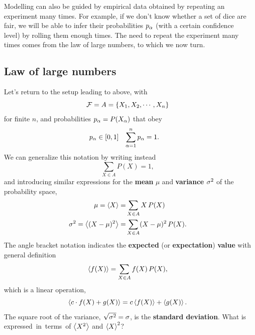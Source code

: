 Modelling can also be guided by empirical data obtained by repeating an experiment many times.
For example, if we don't know whether a set of dice are fair, we will be able to infer their probabilities $p_{\alpha}$ (with a certain confidence level) by rolling them enough times.
The need to repeat the experiment many times comes from the law of large numbers, to which we now turn.



\subsection{\label{sec:LLN}Law of large numbers}
Let's return to the setup leading to  above, with
\begin{equation*}
  \mathcal F = A = \left\{X_1, X_2, \cdots, X_n\right\}
\end{equation*}
for finite $n$, and probabilities $p_{\alpha} = P(X_{\alpha})$ that obey
\begin{align*}
  p_{\alpha} & \in [0, 1] &
  \sum_{\alpha = 1}^n p_{\alpha} & = 1.
\end{align*}
We can generalize this notation by writing instead
\begin{equation*}
  \sum_{X \in A} P(X) = 1,
\end{equation*}
and introducing similar expressions for the \textbf{mean} $\mu$ and \textbf{variance} $\sigma^2$ of the probability space,
\begin{align}
              \mu = \left\langle X \right\rangle = & \sum_{X \in A} X \, P(X)            \label{eq:mean} \\
  \sigma^2 = \left\langle (X - \mu)^2 \right\rangle = & \sum_{X \in A} (X - \mu)^2 \, P(X). \label{eq:var}
\end{align}
The angle bracket notation indicates the \textbf{expected} (or \textbf{expectation}) \textbf{value} with general definition
\begin{equation}
  \label{eq:expect_disc}
  \left\langle f(X) \right\rangle = \sum_{X \in A} f(X) \, P(X),
\end{equation}
which is a linear operation,
\begin{equation*}
  \left\langle c\cdot f(X) + g(X) \right\rangle = c\left\langle f(X) \right\rangle + \left\langle g(X) \right\rangle.
\end{equation*}
The square root of the variance, $\sqrt{\sigma^2} = \sigma$, is the \textbf{standard deviation}.
What is \si expressed in terms of $\left\langle X^2 \right\rangle$ and $\left\langle X \right\rangle^2$?
\begin{mdframed}
  \ \\[100 pt]
\end{mdframed}

